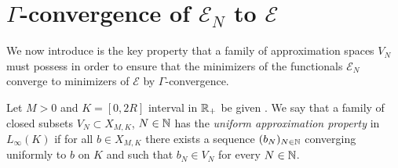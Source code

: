 
\section{$\Gamma$-convergence of $\mathcal E_N$ to $\mathcal E$}


We now introduce is the key property that a family of approximation spaces $V_N$ must possess in order to ensure that the minimizers of the functionals $\mathcal E_N$ converge to minimizers of $\mathcal E$ by $\Gamma$-convergence.

\begin{definition}\label{VNdef}
Let $M > 0$ and $K=[0,2R]$ interval in $\mathbb{R}_+$  be given . We say that a family of closed subsets $V_N \subset X_{M,K}$, $N \in \mathbb{N}$ has the \emph{uniform approximation property} in $L_{\infty}(K)$ if for all $b\in X_{M,K}$ there exists a sequence $(b_N)_{N \in \mathbb{N}}$ converging uniformly to $b$ on $K$ and such that $b_N\in V_N$ for every $N \in \mathbb{N}$.
\end{definition}


